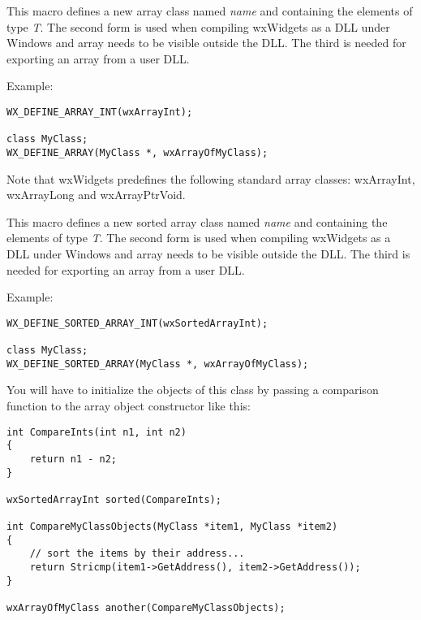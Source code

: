 This macro defines a new array class named {\it name} and containing the
elements of type {\it T}. The second form is used when compiling wxWidgets as
a DLL under Windows and array needs to be visible outside the DLL.  The third is
needed for exporting an array from a user DLL.

Example:

\begin{verbatim}
WX_DEFINE_ARRAY_INT(wxArrayInt);

class MyClass;
WX_DEFINE_ARRAY(MyClass *, wxArrayOfMyClass);
\end{verbatim}

Note that wxWidgets predefines the following standard array classes: wxArrayInt,
wxArrayLong and wxArrayPtrVoid.

\label{wxdefinesortedarray}




This macro defines a new sorted array class named {\it name} and containing
the elements of type {\it T}. The second form is used when compiling wxWidgets as
a DLL under Windows and array needs to be visible outside the DLL.  The third is
needed for exporting an array from a user DLL.

Example:

\begin{verbatim}
WX_DEFINE_SORTED_ARRAY_INT(wxSortedArrayInt);

class MyClass;
WX_DEFINE_SORTED_ARRAY(MyClass *, wxArrayOfMyClass);
\end{verbatim}

You will have to initialize the objects of this class by passing a comparison
function to the array object constructor like this:

\begin{verbatim}
int CompareInts(int n1, int n2)
{
    return n1 - n2;
}

wxSortedArrayInt sorted(CompareInts);

int CompareMyClassObjects(MyClass *item1, MyClass *item2)
{
    // sort the items by their address...
    return Stricmp(item1->GetAddress(), item2->GetAddress());
}

wxArrayOfMyClass another(CompareMyClassObjects);
\end{verbatim}

